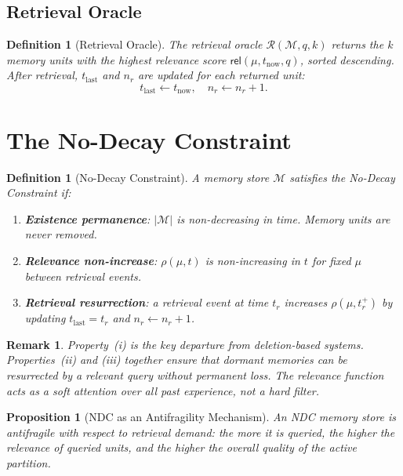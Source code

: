 \documentclass[12pt]{article}
\newtheorem{definition}[theorem]{Definition}
\newtheorem{proposition}[theorem]{Proposition}
\newtheorem{remark}[theorem]{Remark}
\newcommand{\MEM}{\mathcal{M}}
\newcommand{\REL}{\mathsf{rel}}
\begin{document}
\subsection{Retrieval Oracle}

\begin{definition}[Retrieval Oracle]
  The \emph{retrieval oracle} $\mathcal{R}(\MEM, q, k)$ returns the $k$ memory
  units with the highest relevance score $\REL(\mu, t_\text{now}, q)$, sorted
  descending.  After retrieval, $t_\text{last}$ and $n_r$ are updated for each
  returned unit:
  \[
    t_\text{last} \gets t_\text{now}, \quad n_r \gets n_r + 1.
  \]
\end{definition}

\section{The No-Decay Constraint}
\label{sec:ndc}

\begin{definition}[No-Decay Constraint]
  A memory store $\MEM$ satisfies the \emph{No-Decay Constraint} if:
  \begin{enumerate}[label=(\roman*)]
    \item \textbf{Existence permanence}: $|\MEM|$ is non-decreasing in time.
      Memory units are never removed.
    \item \textbf{Relevance non-increase}: $\rho(\mu, t)$ is non-increasing in
      $t$ for fixed $\mu$ between retrieval events.
    \item \textbf{Retrieval resurrection}: a retrieval event at time $t_r$
      increases $\rho(\mu, t_r^+)$ by updating $t_\text{last} = t_r$ and
      $n_r \gets n_r + 1$.
  \end{enumerate}
\end{definition}

\begin{remark}
  Property~(i) is the key departure from deletion-based systems.  Properties~(ii)
  and (iii) together ensure that dormant memories can be resurrected by a
  relevant query without permanent loss.  The relevance function acts as a
  \emph{soft attention} over all past experience, not a hard filter.
\end{remark}

\begin{proposition}[NDC as an Antifragility Mechanism]
  An NDC memory store is \emph{antifragile} with respect to retrieval demand:
  the more it is queried, the higher the relevance of queried units, and the
  higher the overall quality of the active partition.
\end{proposition}
\end{document}
